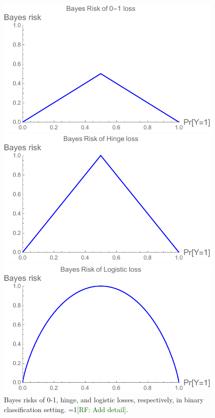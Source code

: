 \documentclass[11pt]{article}
\newcommand{\Comments}{1}
\newcommand{\mynote}[2]{\ifnum\Comments=1\textcolor{#1}{#2}\fi}
\newcommand{\raf}[1]{\mynote{darkgreen}{[RF: #1]}}
\begin{document}
\begin{figure}
	\begin{minipage}{0.3\linewidth}
	\centering
	\includegraphics[width=0.95\linewidth]{figs/0-1-br.pdf}
	\end{minipage}
	\hfill
	\begin{minipage}{0.3\linewidth}
	\centering		\includegraphics[width=0.95\linewidth]{figs/hinge-br.pdf}
	\end{minipage}
	\hfill
	\begin{minipage}{0.3\linewidth}
	\centering
	\includegraphics[width=0.95\linewidth]{figs/logistic-br.pdf}
\end{minipage}
\caption{Bayes risks of 0-1, hinge, and logistic losses, respectively, in binary classification setting. \raf{Add detail}.}
\label{fig:bayes-risks-01}
\end{figure}
\end{document}
